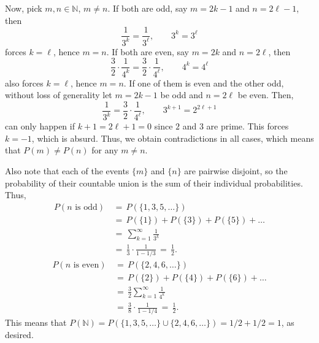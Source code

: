 \documentclass[10pt]{article}
\newcounter{prob}
\begin{document}
        Now, pick $m, n \in \mathbb{N}$, $m \neq n$. If both are odd, say $m = 2k -
        1$ and $n = 2\ell - 1$, then \[
                \frac{1}{3^k} = \frac{1}{3^\ell}, \qquad 3^k = 3^\ell
        \] forces $k = \ell$, hence $m = n$. If both are even, say $m = 2k$ and 
        $n = 2\ell$, then \[
                \frac{3}{2}\cdot \frac{1}{4^k} = \frac{3}{2}\cdot \frac{1}{4^\ell},
                \qquad 4^k = 4^\ell
        \] also forces $k = \ell$, hence $m = n$.
        If one of them is even and the other odd, without loss of generality let $m
        = 2k - 1$ be odd and $n = 2\ell$ be even. Then, \[
                \frac{1}{3^k} = \frac{3}{2}\cdot \frac{1}{4^\ell}, \qquad
                3^{k + 1} = 2^{2\ell + 1}
        \] can only happen if $k + 1 = 2\ell + 1 = 0$ since $2$ and $3$ are prime.
        This forces $k = -1$, which is absurd. Thus, we obtain contradictions in all
        cases, which means that $P(m) \neq P(n)$ for any $m \neq n$.

        Also note that each of the events $\{m\}$ and $\{n\}$ are pairwise disjoint,
        so the probability of their countable union is the sum of their individual
        probabilities. Thus,
        \begin{align*}
                P(n\text{ is odd}) \,&=\, P(\{1, 3, 5, \dots\}) \\ 
                  \,&=\, P(\{1\}) + P(\{3\}) + P(\{5\}) + \dots \\
                  \,&=\, \sum_{k = 1}^{\infty} \frac{1}{3^k} \\
                  \,&=\, \frac{1}{3}\cdot \frac{1}{1 - 1 /3} \,=\, \frac{1}{2}.
        \end{align*}
        \begin{align*}
                P(n\text{ is even}) \,&=\,  P(\{2, 4, 6, \dots\}) \\
                  \,&=\, P(\{2\}) + P(\{4\}) + P(\{6\}) + \dots \\ 
                  \,&=\, \frac{3}{2}\sum_{k = 1}^{\infty} \frac{1}{4^k} \\ 
                  \,&=\, \frac{3}{8}\cdot \frac{1}{1 - 1 /4} \,=\, \frac{1}{2}.
        \end{align*}
        This means that $P(\mathbb{N}) = P(\{1, 3, 5, \dots\} \cup \{2, 4, 6, 
        \dots\}) = 1 /2 + 1 /2 = 1$, as desired.
\end{document}
